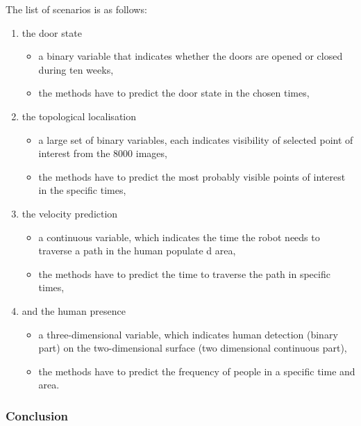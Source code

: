 The list of scenarios is as follows:
\begin{enumerate}
    \item the door state
    \begin{itemize}
        \item a binary variable that indicates whether the doors are opened or closed during ten weeks,
        \item the methods have to predict the door state in the chosen times,
    \end{itemize}
    \item the topological localisation
    \begin{itemize}
        \item a large set of binary variables, each indicates visibility of selected point of interest from the $8000$ images,
        \item the methods have to predict the most probably visible points of interest in the specific times,
    \end{itemize}
    \item the velocity prediction
    \begin{itemize}
        \item a continuous variable, which indicates the time the robot needs to traverse a path in the human populate
d area,
        \item the methods have to predict the time to traverse the path in specific times,
    \end{itemize}
    \item and the human presence
    \begin{itemize}
        \item a three-dimensional variable, which indicates human detection (binary part) on the two-dimensional surface (two dimensional continuous part),
        \item the methods have to predict the frequency of people in a specific time and area.
    \end{itemize}
\end{enumerate}

\subsubsection{Conclusion}

